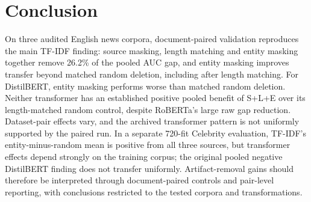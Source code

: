 \section{Conclusion}
On three audited English news corpora, document-paired validation reproduces the main TF-IDF finding: source masking, length matching and entity masking together remove 26.2\% of the pooled AUC gap, and entity masking improves transfer beyond matched random deletion, including after length matching. For DistilBERT, entity masking performs worse than matched random deletion. Neither transformer has an established positive pooled benefit of S+L+E over its length-matched random control, despite RoBERTa's large raw gap reduction. Dataset-pair effects vary, and the archived transformer pattern is not uniformly supported by the paired run. In a separate 720-fit Celebrity evaluation, TF-IDF's entity-minus-random mean is positive from all three sources, but transformer effects depend strongly on the training corpus; the original pooled negative DistilBERT finding does not transfer uniformly. Artifact-removal gains should therefore be interpreted through document-paired controls and pair-level reporting, with conclusions restricted to the tested corpora and transformations.
